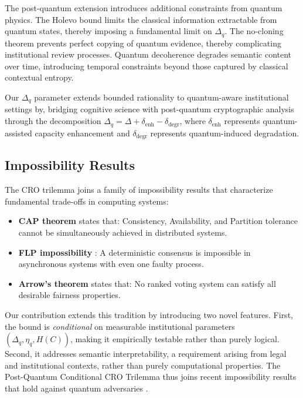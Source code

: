 \documentclass{ieeeaccess}
\begin{document}
The post-quantum extension introduces additional constraints from quantum physics. The Holevo bound limits the classical information extractable from quantum states, thereby imposing a fundamental limit on $\Delta_q$. The no-cloning theorem \cite{Wootters1982} prevents perfect copying of quantum evidence, thereby complicating institutional review processes. Quantum decoherence \cite{Zurek2003} degrades semantic content over time, introducing temporal constraints beyond those captured by classical contextual entropy.

Our $\Delta_q$ parameter extends bounded rationality to quantum-aware institutional settings by, bridging cognitive science with post-quantum cryptographic analysis through the decomposition $\Delta_q = \Delta + \delta_{\text{enh}} - \delta_{\text{degr}}$, where $\delta_{\text{enh}}$ represents quantum-assisted capacity enhancement and $\delta_{\text{degr}}$ represents quantum-induced degradation.

\subsection{Impossibility Results}

The CRO trilemma joins a family of impossibility results that characterize fundamental trade-offs in computing systems:
\begin{itemize}
    \item \textbf{CAP theorem} \cite{Brewer2000} states that: Consistency, Availability, and Partition tolerance cannot be simultaneously achieved in distributed systems.
    \item \textbf{FLP impossibility} \cite{Fischer1985}: A deterministic consensus is impossible in asynchronous systems with even one faulty process.
    \item \textbf{Arrow's theorem} \cite{Arrow1950} states that: No ranked voting system can satisfy all desirable fairness properties.
\end{itemize}

Our contribution extends this tradition by introducing two novel features. First, the bound is \textit{conditional} on measurable institutional parameters $(\Delta_q, \eta_q, H(C))$, making it empirically testable rather than purely logical. Second, it addresses semantic interpretability, a requirement arising from legal and institutional contexts, rather than purely computational properties. The Post-Quantum Conditional CRO Trilemma thus joins recent impossibility results that hold against quantum adversaries \cite{Ambainis2000, Brassard1998, Mayers1997, Lo1997, Watrous2009, Unruh2016}.
\end{document}
